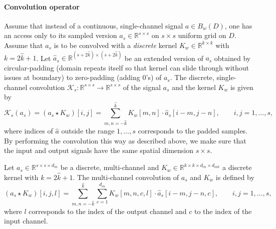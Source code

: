 \documentclass[reqno,10pt]{amsart}
\theoremstyle{plain}
\theoremstyle{definition}
\newcommand{\bb}[1]{\mathbb{#1}}
\newcommand{\cal}[1]{\mathcal{#1}}
\begin{document}
    \paragraph{\bf Convolution operator} Assume that instead of a continuous, single-channel signal $a\in B_w(D)$, one has an access only to its sampled version $a_s \in \bb R^{s\times s}$ on $s\times s$ uniform grid on $D$. Assume that $a_s$ is to be convolved with a {\it discrete} kernel $K_w \in \bb R^{k \times k}$ with $k = 2 \hat{k}+1$. Let $\hat{a}_s \in \bb R^{(s+2\hat{k}) \times (s+2\hat{k})}$ be an extended version of $a_s$ obtained by circular-padding (domain repeats itself so that kernel can slide through without issues at boundary) to zero-padding (adding $0$'s) of $a_s$. The discrete, single-channel convolution $\cal K_s : \bb R^{s\times s} \to \bb R^{s\times s}$ of the signal $a_s$ and the kernel $K_w$ is given by
    $$ \cal K_s(a_s) = (a_s \star K_w)[i,j] = \sum_{m,n=-\hat{k}}^{\hat{k}} K_w[m,n] \cdot \hat{a}_s [i-m,j-n], \qquad i,j = 1,\dots, s,$$
    where indices of $\hat{a}$ outside the range $1,\dots, s$ corresponds to the padded samples. By performing the convolution this way as described above, we make sure that the input and output signals have the same spatial dimension $s\times s$.

    \noindent Let $a_s \in \bb R^{s\times s\times d_{in}}$ be a discrete, multi-channel and $K_w \in \bb R^{k\times k\times d_{in} \times d_{out}}$ a discrete kernel with $k = 2\hat{k}+1$. The multi-channel convolution of $a_s$ and $K_w$ is defined by
    $$(a_s \star K_w)[i,j,l] = \sum_{m,n=-\hat{k}}^{\hat{k}} \sum_{c=1}^{d_{in}} K_w[m,n,c,l] \cdot \hat{a}_s[i-m, j-n, c], \qquad i,j = 1, \dots, s,$$
    where $l$ corresponds to the index of the output channel and $c$ to the index of the input channel.
\end{document}
